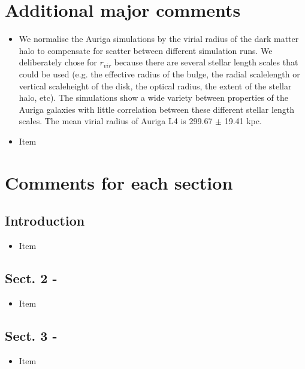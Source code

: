 \documentclass{article}
\begin{document}
\section*{Additional major comments}
\begin{itemize}
\item We normalise the Auriga simulations by the virial radius of the
dark matter halo to compensate for scatter between different simulation runs. We
deliberately chose for $r_{vir}$ because there are several stellar length scales
that could be used (e.g. the effective radius of the bulge, the radial scalelength
or vertical scaleheight of the disk, the optical radius, the extent of the stellar 
halo, etc). The simulations show a wide variety between properties of the Auriga
galaxies with little correlation between these different stellar length scales.
The mean virial radius of Auriga L4 is 299.67 $\pm$ 19.41 kpc.
\item Item
\end{itemize}


\section*{Comments for each section}
\subsection*{Introduction}
\begin{itemize}
\item Item
\end{itemize}

\subsection*{Sect. 2 -}
\begin{itemize}
\item Item
\end{itemize}

\subsection*{Sect. 3 -}
\begin{itemize}
\item Item 
\end{itemize}
\end{document}
